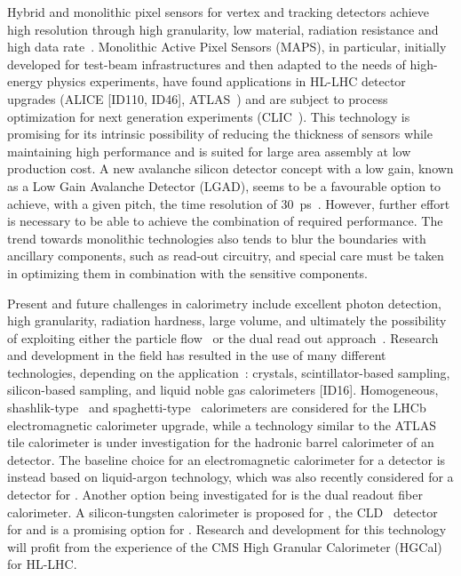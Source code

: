 Hybrid and monolithic pixel sensors for vertex and tracking detectors achieve high resolution through high granularity, low material, radiation resistance and high data rate~\cite{Garcia-Sciveres:2017ymt}. 
Monolithic Active Pixel Sensors (MAPS), in particular, initially developed for test-beam infrastructures and then adapted to the needs of high-energy physics experiments, 
have found applications in HL-LHC detector upgrades (ALICE [ID110, ID46], ATLAS~\cite{MOUSTAKAS2019604}) and are subject to process optimization for next generation experiments (CLIC~\cite{Dannheim:2673779}).
This technology is promising for its intrinsic possibility of reducing the thickness of sensors while maintaining high performance and is suited for large area assembly at low production cost.
A new avalanche silicon detector concept with a low gain, known as a Low Gain Avalanche Detector (LGAD), seems to be a favourable option to achieve, with a given pitch, the time resolution of 30~ps~\cite{Currás:2673324}. 
However, further effort is necessary to be able to achieve the combination of required performance. 
The trend towards monolithic technologies also tends to blur the boundaries with ancillary components, such as read-out circuitry, and special care must be taken in optimizing them in combination with the sensitive components.

Present and future challenges in calorimetry include excellent photon detection, high granularity, radiation hardness, large volume, and ultimately the possibility of exploiting either the particle flow~\cite{Sefkow:2015hna, THOMSON200925} or the dual read out approach~\cite{RevModPhys.90.025002}.
Research and development in the field has resulted in the use of many different technologies, depending on the application~\cite{Sefkow:2015hna}: crystals, scintillator-based sampling, silicon-based sampling, and liquid noble gas calorimeters [ID16].
Homogeneous, shashlik-type~\cite{shashlik} and spaghetti-type~\cite{Acosta:1991ap} calorimeters are considered for the LHCb electromagnetic calorimeter upgrade, while a technology similar to the ATLAS tile calorimeter is under investigation for the hadronic barrel calorimeter of an \FCChh detector. The baseline choice for an electromagnetic calorimeter for a \FCChh detector is instead based on liquid-argon technology, which was also recently considered for a detector for \FCCee.
Another option being investigated for \FCCee is the dual readout fiber calorimeter.
A silicon-tungsten calorimeter is proposed for \CLIC, the CLD~\cite{CLD} detector for \FCCee and is a promising option for \FCChh. Research and development for this technology will profit from the experience of the CMS High Granular Calorimeter (HGCal) for HL-LHC.

